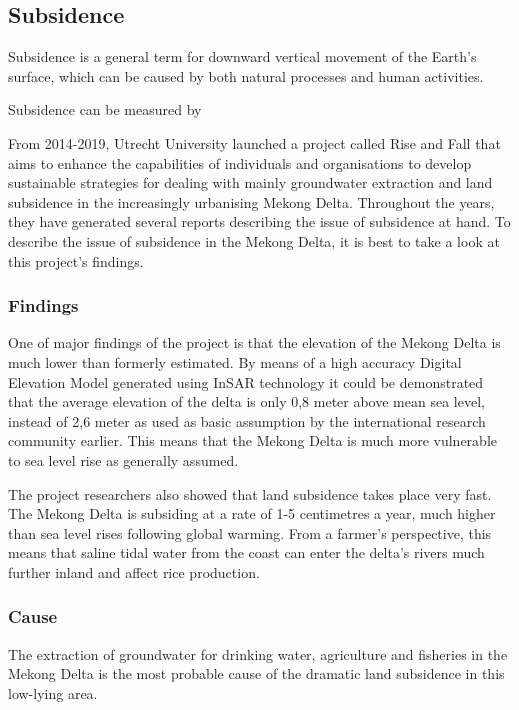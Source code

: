 \newpage
\subsection{Subsidence}
Subsidence is a general term for downward vertical movement of the Earth's surface, which can be caused by both natural processes and human activities. 

Subsidence can be measured by 

From 2014-2019, Utrecht University launched a project called Rise and Fall that aims to enhance the capabilities of individuals and organisations to develop sustainable strategies for dealing with mainly groundwater extraction and land subsidence in the increasingly urbanising Mekong Delta. Throughout the years, they have generated several reports describing the issue of subsidence at hand. To describe the issue of subsidence in the Mekong Delta, it is best to take a look at this project's findings. \cite{riseandfall}

\subsubsection{Findings}

One of major findings of the project is that the elevation of the Mekong Delta is much lower than formerly estimated. By means of a high accuracy Digital Elevation Model generated using InSAR technology \cite{insar} it could be demonstrated that the average elevation of the delta is only 0,8 meter above mean sea level, instead of 2,6 meter as used as basic assumption by the international research community earlier. This means that the Mekong Delta is much more vulnerable to sea level rise as generally assumed. \cite{minderhoud2017}

The project researchers also showed that land subsidence takes place very fast. The Mekong Delta is subsiding at a rate of 1-5 centimetres a year, much higher than sea level rises following global warming. From a farmer’s perspective, this means that saline tidal water from the coast can enter the delta’s rivers much further inland and affect rice production.

\subsubsection{Cause}
The extraction of groundwater for drinking water, agriculture and fisheries in the Mekong Delta is the most probable cause of the dramatic land subsidence in this low-lying area. 

